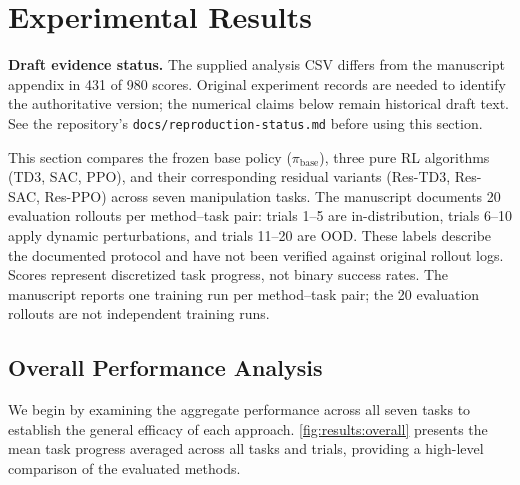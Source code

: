 
\section{Experimental Results}
\label{sec:results}

\noindent\textbf{Draft evidence status.} The supplied analysis CSV differs from the manuscript appendix in 431 of 980 scores. Original experiment records are needed to identify the authoritative version; the numerical claims below remain historical draft text. See the repository's \texttt{docs/reproduction-status.md} before using this section.

This section compares the frozen base policy ($\pi_{\text{base}}$), three pure \ac{RL} algorithms (TD3, SAC, PPO), and their corresponding residual variants (Res-TD3, Res-SAC, Res-PPO) across seven manipulation tasks. The manuscript documents 20 evaluation rollouts per method--task pair: trials 1--5 are in-distribution, trials 6--10 apply dynamic perturbations, and trials 11--20 are \ac{OOD}. These labels describe the documented protocol and have not been verified against original rollout logs. Scores represent discretized task progress, not binary success rates. The manuscript reports one training run per method--task pair; the 20 evaluation rollouts are not independent training runs.

\subsection{Overall Performance Analysis}
\label{sec:results:overall}

We begin by examining the aggregate performance across all seven tasks to establish the general efficacy of each approach. \autoref{fig:results:overall} presents the mean task progress averaged across all tasks and trials, providing a high-level comparison of the evaluated methods.

